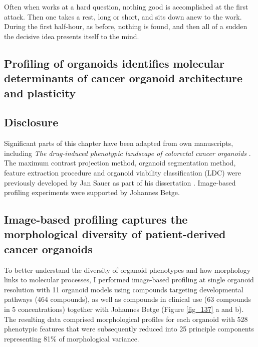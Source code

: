 \begin{savequote}[75mm]
Often when works at a hard question, nothing good is accomplished at the first attack. Then one takes a rest, long or short, and sits down anew to the work. During the first half-hour, as before, nothing is found, and then all of a sudden the decisive idea presents itself to the mind.
\end{savequote}

\begin{flushleft}
\chapter{Profiling of organoids identifies molecular determinants of cancer organoid architecture and plasticity}

\newpage


\section{Disclosure}
Significant parts of this chapter have been adapted from own manuscripts, including \textit{The drug-induced phenotypic landscape of colorectal cancer organoids} \cite{Betge2022-kr}. The maximum contrast projection method, organoid segmentation method, feature extraction procedure and organoid viability classification (LDC) were previously developed by Jan Sauer as part of his dissertation \cite{noauthor_undated-ij}. Image-based profiling experiments were supported by Johannes Betge. 

\section{Image-based profiling captures the morphological diversity of patient-derived cancer organoids}

To better understand the diversity of organoid phenotypes and how morphology links to molecular processes, I performed image-based profiling at single organoid resolution with 11 organoid models using compounds targeting developmental pathways (464 compounds), as well as compounds in clinical use (63 compounds in 5 concentrations) together with Johannes Betge (Figure \ref{fig_137} a and b). The resulting data comprised morphological profiles for each organoid with 528 phenotypic features  that were subsequently reduced into 25 principle components representing 81\% of morphological variance.


\end{flushleft}
